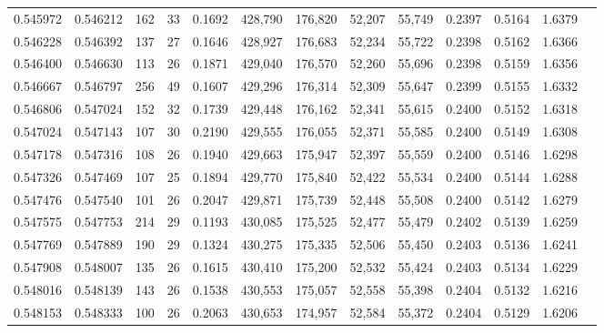 \begin{tabular}{rrrrrrrrrrrrr}
0.545972 & 0.546212 &    162 &    33 &                                     0.1692 & 428,790 & 176,820 &  52,207 &  55,749 & 0.2397 & 0.5164 & 1.6379 \\
0.546228 & 0.546392 &    137 &    27 &                                     0.1646 & 428,927 & 176,683 &  52,234 &  55,722 & 0.2398 & 0.5162 & 1.6366 \\
0.546400 & 0.546630 &    113 &    26 &                                     0.1871 & 429,040 & 176,570 &  52,260 &  55,696 & 0.2398 & 0.5159 & 1.6356 \\
0.546667 & 0.546797 &    256 &    49 &                                     0.1607 & 429,296 & 176,314 &  52,309 &  55,647 & 0.2399 & 0.5155 & 1.6332 \\
0.546806 & 0.547024 &    152 &    32 &                                     0.1739 & 429,448 & 176,162 &  52,341 &  55,615 & 0.2400 & 0.5152 & 1.6318 \\
0.547024 & 0.547143 &    107 &    30 &                                     0.2190 & 429,555 & 176,055 &  52,371 &  55,585 & 0.2400 & 0.5149 & 1.6308 \\
0.547178 & 0.547316 &    108 &    26 &                                     0.1940 & 429,663 & 175,947 &  52,397 &  55,559 & 0.2400 & 0.5146 & 1.6298 \\
0.547326 & 0.547469 &    107 &    25 &                                     0.1894 & 429,770 & 175,840 &  52,422 &  55,534 & 0.2400 & 0.5144 & 1.6288 \\
0.547476 & 0.547540 &    101 &    26 &                                     0.2047 & 429,871 & 175,739 &  52,448 &  55,508 & 0.2400 & 0.5142 & 1.6279 \\
0.547575 & 0.547753 &    214 &    29 &                                     0.1193 & 430,085 & 175,525 &  52,477 &  55,479 & 0.2402 & 0.5139 & 1.6259 \\
0.547769 & 0.547889 &    190 &    29 &                                     0.1324 & 430,275 & 175,335 &  52,506 &  55,450 & 0.2403 & 0.5136 & 1.6241 \\
0.547908 & 0.548007 &    135 &    26 &                                     0.1615 & 430,410 & 175,200 &  52,532 &  55,424 & 0.2403 & 0.5134 & 1.6229 \\
0.548016 & 0.548139 &    143 &    26 &                                     0.1538 & 430,553 & 175,057 &  52,558 &  55,398 & 0.2404 & 0.5132 & 1.6216 \\
0.548153 & 0.548333 &    100 &    26 &                                     0.2063 & 430,653 & 174,957 &  52,584 &  55,372 & 0.2404 & 0.5129 & 1.6206 \\

\end{tabular}

